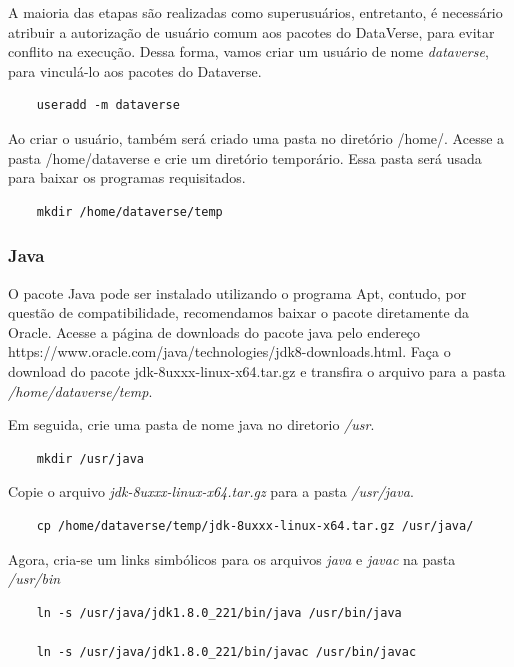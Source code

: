 \documentclass[12pt,hidelinks]{article}
\begin{document}
            
            A maioria das etapas são realizadas como superusuários, entretanto, é necessário atribuir a autorização de usuário comum aos pacotes do DataVerse, para evitar conflito na execução. Dessa forma, vamos criar um usuário de nome \textit{dataverse}, para vinculá-lo aos pacotes do Dataverse.

            \begin{verbatim}
    useradd -m dataverse
            \end{verbatim}
            
            Ao criar o usuário, também será criado uma pasta no diretório /home/. Acesse a pasta /home/dataverse e crie um diretório temporário. Essa pasta será usada para baixar os programas requisitados.
            
            \begin{verbatim}
    mkdir /home/dataverse/temp
            \end{verbatim}
            

        \subsubsection{Java}
            
             \qquad O pacote Java pode ser instalado utilizando o programa Apt, contudo, por questão de compatibilidade, recomendamos baixar o pacote diretamente da Oracle. Acesse a página de downloads do pacote java pelo endereço https://www.oracle.com/java/technologies/jdk8-downloads.html. Faça o download do pacote jdk-8uxxx-linux-x64.tar.gz e transfira o arquivo para a pasta \textit{/home/dataverse/temp}.
             
            Em seguida, crie uma pasta de nome java no diretorio \textit{/usr}.
            \begin{verbatim}
    mkdir /usr/java
            \end{verbatim}
            
            Copie o arquivo \textit{jdk-8uxxx-linux-x64.tar.gz} para a pasta \textit{/usr/java}.
            \begin{verbatim}
    cp /home/dataverse/temp/jdk-8uxxx-linux-x64.tar.gz /usr/java/
            \end{verbatim}
            
            Agora, cria-se um links simbólicos para os arquivos \textit{java} e \textit{javac} na pasta \textit{/usr/bin}
            \begin{verbatim}
    ln -s /usr/java/jdk1.8.0_221/bin/java /usr/bin/java
    
    ln -s /usr/java/jdk1.8.0_221/bin/javac /usr/bin/javac
            \end{verbatim}
            
\end{document}
